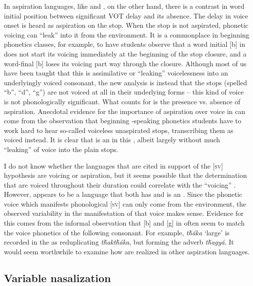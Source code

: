 \documentclass[output=paper]{LSP/langsci}
\begin{document}
In aspiration languages, like  and , on the other hand, there is a contrast in word initial position between significant VOT delay and its absence. The delay in voice onset is heard as aspiration on the stop. When the stop is not aspirated, phonetic voicing can ``leak'' into it from the environment. It is a commonplace in beginning phonetics classes, for example, to have students observe that a word initial [b] in  does not start its voicing immediately at the beginning of the stop closure, and a word-final [b] loses its voicing part way through the closure. Although most of us have been taught that this is assimilative or ``leaking'' voicelessness into an underlyingly voiced consonant, the new analysis is instead that the stops (spelled ``b'', ``d'', ``g'') are not voiced at all in their underlying forms -- this kind of voice is not phonologically significant. What counts for  is the presence vs. absence of aspiration. Anecdotal evidence for the importance of aspiration over voice in  can come from the observation that beginning -speaking phonetics students have to work hard to hear so-called voiceless unaspirated stops, transcribing them as voiced instead. It is clear that  is an  in this , albeit largely without much ``leaking'' of voice into the plain stops.

I do not know whether the languages that are cited in support of the [\textsc{sv}] hypothesis are voicing or aspiration, but it seems possible that the determination that  are voiced throughout their duration could correlate with the ``voicing'' . However,  appears to be a language that both has  and is an . Since the phonetic voice which manifests phonological [\textsc{sv}] can only come from the environment, the observed variability in the manifestation of that voice makes sense. Evidence for this comes from the informal observation that [b] and [g] in  often seem to match the voice phonetics of the following consonant. For example, \textit{t\v{h}\'aka} `large' is recorded in the  as reduplicating \textit{t\v{h}akt\v{h}\'aka}, but forming the adverb \textit{t\v{h}agy\'a}. It would seem worthwhile to examine how  are realized in other aspiration languages.

\subsection{Variable nasalization}
\end{document}
